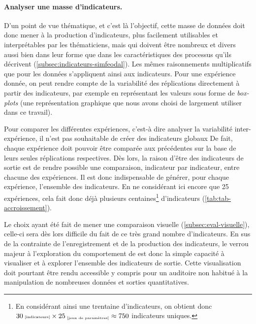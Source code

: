\paragraph{Analyser une masse d'indicateurs.}
D'un point de vue thématique, et c'est là l'objectif, cette masse de données doit donc mener à la production d'indicateurs, plus facilement utilisables et interprétables par les thématiciens, mais qui doivent être nombreux et divers aussi bien dans leur forme que dans les caractéristiques des processus qu'ils décrivent (\cref{subsec:indicateurs-simfeodal}).
Les mêmes raisonnements \og multiplicatifs\fg{} que pour les données s'appliquent ainsi aux indicateurs.
Pour une expérience donnée, on peut rendre compte de la variabilité des réplications directement à partir des indicateurs, par exemple en représentant les valeurs sous forme de \textit{box-plots} (une représentation graphique que nous avons choisi de largement utiliser dans ce travail).

Pour comparer les différentes expériences, c'est-à dire analyser la variabilité inter-expérience, il n'est pas souhaitable de créer des indicateurs globaux
De fait, chaque expérience doit pouvoir être comparée aux précédentes sur la base de leurs seules réplications respectives.
Dès lors, la raison d'être des indicateurs de sortie est de rendre possible une comparaison, indicateur par indicateur, entre chacune des expériences.
Il est donc indispensable de générer, pour chaque expérience, l'ensemble des indicateurs. En ne considérant ici encore que 25 expériences, cela fait donc déjà plusieurs centaines\footnote{
	En considérant ainsi une trentaine d'indicateurs, on obtient donc $30{\text{\tiny ~[indicateurs]}} \times 25_{\text{\tiny ~[jeux de paramètres]}} \approx 750$ indicateurs uniques.
} d'indicateurs (\cref{tab:tab-accroissement}).

Le choix ayant été fait de mener une comparaison visuelle (\cref{subsec:eval-visuelle}), celle-ci sera dès lors difficile du fait de ce très grand nombre d'indicateurs.
En sus de la contrainte de l'enregistrement et de la production des indicateurs, le verrou majeur à l'exploration du comportement de \simfeodal{} est donc la simple capacité à visualiser et à explorer l'ensemble des indicateurs de sortie.
Cette visualisation doit pourtant être rendu accessible y compris pour un auditoire non habitué à la manipulation de nombreuses données et sorties quantitatives.


